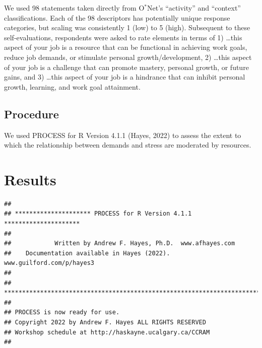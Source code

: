 \documentclass[
  english,
  man]{apa6}
\begin{document}
We used 98 statements taken directly from O\(^{*}\)Net's ``activity'' and ``context'' classifications. Each of the 98 descriptors has potentially unique response categories, but scaling was consistently 1 (low) to 5 (high). Subsequent to these self-evaluations, respondents were asked to rate elements in terms of 1) \ldots this aspect of your job is a resource that can be functional in achieving work goals, reduce job demands, or stimulate personal growth/development, 2) \ldots this aspect of your job is a challenge that can promote mastery, personal growth, or future gains, and 3) \ldots this aspect of your job is a hindrance that can inhibit personal growth, learning, and work goal attainment.

\hypertarget{procedure}{%
\subsection{Procedure}\label{procedure}}

We used PROCESS for R Version 4.1.1 (Hayes, 2022) to assess the extent to which the relationship between demands and stress are moderated by resources.

\hypertarget{results}{%
\section{Results}\label{results}}

\begin{verbatim}
## 
## ********************* PROCESS for R Version 4.1.1 ********************* 
##  
##            Written by Andrew F. Hayes, Ph.D.  www.afhayes.com              
##    Documentation available in Hayes (2022). www.guilford.com/p/hayes3   
##  
## *********************************************************************** 
##  
## PROCESS is now ready for use.
## Copyright 2022 by Andrew F. Hayes ALL RIGHTS RESERVED
## Workshop schedule at http://haskayne.ucalgary.ca/CCRAM
## 
\end{verbatim}
\end{document}
